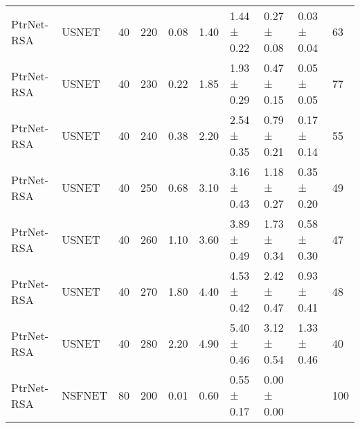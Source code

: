 \begin{longtable}[!htbp]{llll|lllll|l}
PtrNet-RSA           & USNET             & 40                   & 220                                                               & 0.08 & \multicolumn{1}{l|}{1.40}     & 1.44 ± 0.22 & 0.27 ± 0.08      & 0.03 ± 0.04       & 63                                                                                    \\
PtrNet-RSA           & USNET             & 40                   & 230                                                               & 0.22 & \multicolumn{1}{l|}{1.85}    & 1.93 ± 0.29 & 0.47 ± 0.15      & 0.05 ± 0.05       & 77                                                                                    \\
PtrNet-RSA           & USNET             & 40                   & 240                                                               & 0.38 & \multicolumn{1}{l|}{2.20}     & 2.54 ± 0.35 & 0.79 ± 0.21      & 0.17 ± 0.14       & 55                                                                                    \\
PtrNet-RSA           & USNET             & 40                   & 250                                                               & 0.68 & \multicolumn{1}{l|}{3.10}     & 3.16 ± 0.43 & 1.18 ± 0.27      & 0.35 ± 0.20        & 49                                                                                    \\
PtrNet-RSA           & USNET             & 40                   & 260                                                               & 1.10  & \multicolumn{1}{l|}{3.60}     & 3.89 ± 0.49 & 1.73 ± 0.34      & 0.58 ± 0.30        & 47                                                                                    \\
PtrNet-RSA           & USNET             & 40                   & 270                                                               & 1.80  & \multicolumn{1}{l|}{4.40}     & 4.53 ± 0.42 & 2.42 ± 0.47      & 0.93 ± 0.41       & 48                                                                                    \\
PtrNet-RSA           & USNET             & 40                   & 280                                                               & 2.20  & \multicolumn{1}{l|}{4.90}     & 5.40 ± 0.46  & 3.12 ± 0.54      & 1.33 ± 0.46       & 40                                                                                    \\
PtrNet-RSA           & NSFNET            & 80                   & 200                                                               & 0.01 & \multicolumn{1}{l|}{0.60}     & 0.55 ± 0.17 & 0.00 ± 0.00            &                   & 100                                                                                     \\

\end{longtable}
